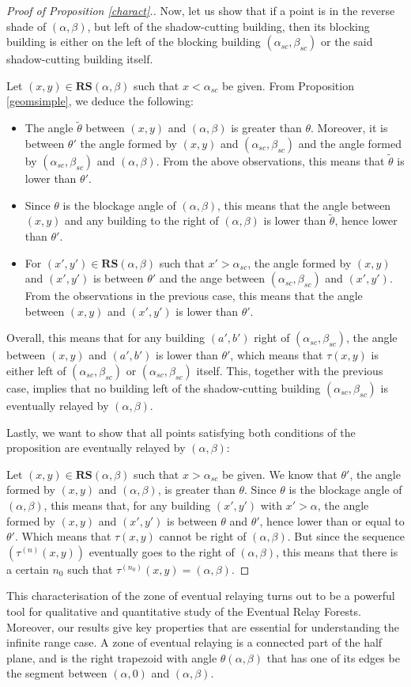 \documentclass[10pt,english,a4paper]{smfart}
\theoremstyle{definition}
\theoremstyle{remark}
\newcommand{\rs}{\textbf{RS}}
\newcommand{\rb}{(\alpha_{sc}, \beta_{sc})}
\begin{document}
\begin{proof}[Proof of Proposition \ref{charact}.]
Now, let us show that if a point is in the reverse shade of $(\alpha, \beta)$, but left of the shadow-cutting building, then its blocking building is either on the left of the blocking building $\rb$ or the said shadow-cutting building itself.

Let $(x, y)\in \rs(\alpha, \beta)$ such that $x<\alpha_{sc}$ be given. From Proposition \ref{geomsimple}, we deduce the following:
\begin{itemize}
    \item The angle $\tilde{\theta}$ between $(x, y)$ and $(\alpha, \beta)$ is greater than $\theta$. Moreover, it is between $\theta '$ the angle formed by $(x, y)$ and $\rb$ and the angle formed by $\rb$ and $(\alpha, \beta)$. From the above observations, this means that $\tilde{\theta}$ is lower than $\theta '$.
    \item Since $\theta$ is the blockage angle of $(\alpha, \beta)$, this means that the angle between $(x, y)$ and any building to the right of $(\alpha, \beta)$ is lower than $\tilde{\theta}$, hence lower than $\theta '$.
    \item For $(x', y')\in \rs(\alpha, \beta)$ such that $x '>\alpha_{sc}$, the angle formed by $(x, y)$ and $(x', y')$ is between $\theta '$ and the ange between $\rb$ and $(x', y')$. From the observations in the previous case, this means that the angle between $(x, y)$ and $(x', y')$ is lower than $\theta '$.
\end{itemize}
Overall, this means that for any building $(a', b')$ right of $\rb$, the angle between $(x, y)$ and $(a', b')$ is lower than $\theta'$, which means that $\tau(x, y)$ is either left of $\rb$ or $\rb$ itself. This, together with the previous case, implies that no building left of the shadow-cutting building $\rb$ is eventually relayed by $(\alpha, \beta)$.

Lastly, we want to show that all points satisfying both conditions of the proposition are eventually relayed by $(\alpha, \beta)$:

Let $(x, y)\in \rs(\alpha, \beta)$ such that $x>\alpha_{sc}$ be given. We know that $\theta '$, the angle formed by $(x, y)$ and $(\alpha, \beta)$, is  greater than $\theta$. Since $\theta$ is the blockage angle of $(\alpha, \beta)$, this means that, for any building $(x ', y')$ with $x '> \alpha$, the angle formed by $(x, y)$ and $(x',  y')$ is between $\theta$ and $\theta '$, hence lower than or equal to $\theta '$. Which means that $\tau (x, y)$ cannot be right of $(\alpha, \beta)$. But since the sequence $(\tau^{(n)}(x, y))$ eventually goes to the right of $(\alpha, \beta)$, this means that there is a certain $n_0$ such that $\tau^{(n_0)}(x, y) = (\alpha, \beta)$.
\end{proof}
This characterisation of the zone of eventual relaying turns out to be a powerful tool for qualitative and quantitative study of the Eventual Relay Forests. Moreover, our results give key properties that are essential for understanding the infinite range case. A zone of eventual relaying is a connected part of the half plane, and is the right trapezoid with angle $\theta(\alpha, \beta)$ that has one of its edges be the segment between $(\alpha, 0)$ and $(\alpha, \beta)$.
\end{document}
